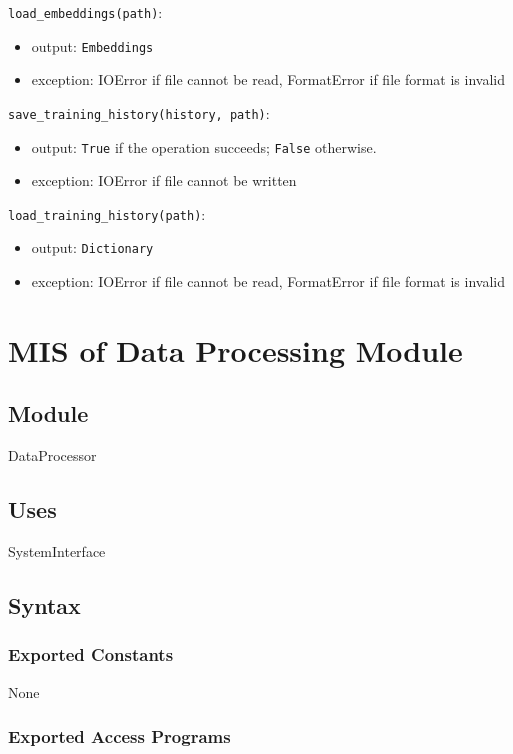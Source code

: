 \documentclass[12pt, titlepage]{article}
\begin{document}
\noindent \texttt{load\_embeddings(path)}:
\begin{itemize}
\item output: \texttt{Embeddings}
\item exception: IOError if file cannot be read, FormatError if file format is invalid
\end{itemize}

\noindent \texttt{save\_training\_history(history, path)}:
\begin{itemize}
\item output: \texttt{True} if the operation succeeds; \texttt{False} otherwise.
\item exception: IOError if file cannot be written
\end{itemize}

\noindent \texttt{load\_training\_history(path)}:
\begin{itemize}
\item output: \texttt{Dictionary}
\item exception: IOError if file cannot be read, FormatError if file format is invalid
\end{itemize}

\newpage

\section{MIS of Data Processing Module} \label{ModuleDP}

\subsection{Module}

DataProcessor

\subsection{Uses}
SystemInterface

\subsection{Syntax}

\subsubsection{Exported Constants}
None
\subsubsection{Exported Access Programs}
\end{document}
